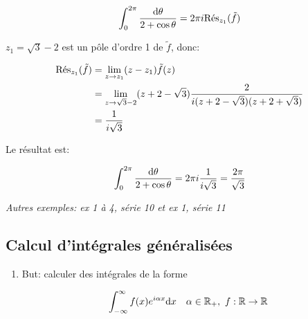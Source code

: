 \begin{enumerate}[label=\alph*)]
\begin{example}[2]
        \[ \int_0^{2\pi} \frac{\dth}{2 + \cos \theta} = 2\pi i \Res_{z_1} (\tilde{f}) \]
        
        $z_1 = \sqrt{3} - 2$ est un pôle d'ordre 1 de $\tilde{f}$, donc:
        
        \begin{align*}
        \Res_{z_1} (\tilde{f}) &= \lim_{z \rightarrow z_1} (z - z_1) \tilde{f}(z)
        \\&= \lim_{z \rightarrow \sqrt{3} - 2} (z + 2 - \sqrt{3}) \frac{2}{i(z + 2 - \sqrt{3})(z + 2 + \sqrt{3})}
        \\&= \frac{1}{i\sqrt{3}}
        \end{align*}
        
        Le résultat est:
        
        \[ \int_0^{2\pi} \frac{\dth}{2 + \cos \theta} = 2\pi i \frac{1}{i\sqrt{3}} = \frac{2\pi}{\sqrt{3}} \]
        
        \textit{Autres exemples: ex 1 à 4, série 10 et ex 1, série 11}
    \end{example}
\end{enumerate}

\subsection{Calcul d'intégrales généralisées}

\begin{enumerate}[label=\alph*)]
    \item But: calculer des intégrales de la forme
    
    \[ \int_{-\infty}^\infty f(x) e^{i\alpha x} \dx \quad \alpha \in \R_+,\ f: \R \rightarrow \R \]
\end{enumerate}
